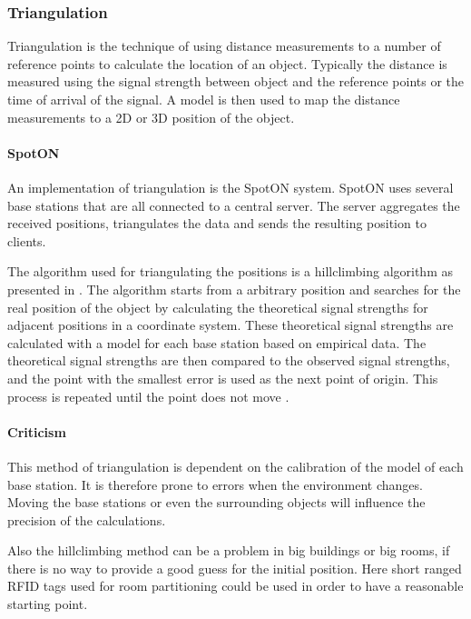 \subsubsection{Triangulation}\label{triangulation}
Triangulation is the technique of using distance measurements to a number of reference points to calculate the location of an object.
Typically the distance is measured using the signal strength between object and the reference points or the time of arrival of the signal.
A model is then used to map the distance measurements to a 2D or 3D position of the object.\cite[Section 4.1]{rfidreview}

\paragraph{SpotON}
An implementation of triangulation is the SpotON system\cite{spoton}.
SpotON uses several base stations that are all connected to a central server.
The server aggregates the received positions, triangulates the data and sends the resulting position to clients. \cite{spoton}

The algorithm used for triangulating the positions is a hillclimbing algorithm as presented in \citet[Section 3.3.1]{spoton}.
The algorithm starts from a arbitrary position and searches for the real position of the object by calculating the theoretical signal strengths for adjacent positions in a coordinate system.
These theoretical signal strengths are calculated with a model for each base station based on empirical data.
The theoretical signal strengths are then compared to the observed signal strengths, and the point with the smallest error is used as the next point of origin.
This process is repeated until the point does not move \cite{spoton}.

\paragraph{Criticism}
This method of triangulation is dependent on the calibration of the model of each base station.
It is therefore prone to errors when the environment changes.
Moving the base stations or even the surrounding objects will influence the precision of the calculations.

Also the hillclimbing method can be a problem in big buildings or big rooms, if there is no way to provide a good guess for the initial position.
Here short ranged RFID tags used for room partitioning could be used in order to have a reasonable starting point.


